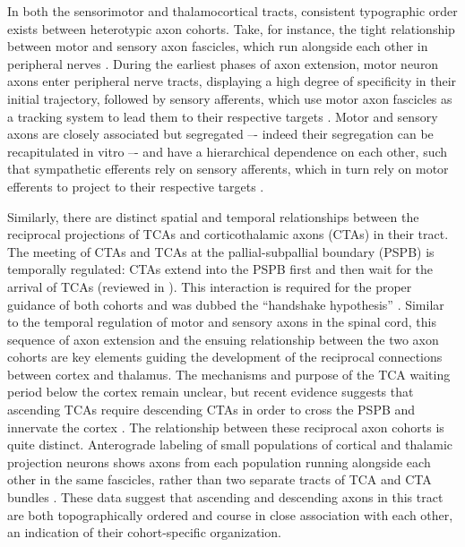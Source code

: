 In both the sensorimotor and thalamocortical tracts, consistent typographic order exists between heterotypic axon cohorts.
Take, for instance, the tight relationship between motor and sensory axon fascicles, which run alongside each other in peripheral nerves \cite{honig1998spatial}. 
During the earliest phases of axon extension, motor neuron axons enter peripheral nerve tracts, displaying a high degree of specificity in their initial trajectory, followed by sensory afferents, which use motor axon fascicles as a tracking system to lead them to their respective targets \cite{landmesser1986altered,huettl2011npn,wang2013axons,wang2014conserved}.
Motor and sensory axons are closely associated but segregated –- indeed their segregation can be recapitulated in vitro \cite{gallarda2008segregation} –- and have a hierarchical dependence on each other, such that sympathetic efferents rely on sensory afferents, which in turn rely on motor efferents to project to their respective targets \cite{wang2014conserved}.

Similarly, there are distinct spatial and temporal relationships between the reciprocal projections of TCAs and corticothalamic axons (CTAs) in their tract.
The meeting of CTAs and TCAs at the pallial-subpallial boundary (PSPB) is temporally regulated: CTAs extend into the PSPB first and then wait for the arrival of TCAs (reviewed in ). 
This interaction is required for the proper guidance of both cohorts and was dubbed the “handshake hypothesis” \cite{molnar1995thalamic}.
Similar to the temporal regulation of motor and sensory axons in the spinal cord, this sequence of axon extension and the ensuing relationship between the two axon cohorts are key elements guiding the development of the reciprocal connections between cortex and thalamus. 
The mechanisms and purpose of the TCA waiting period below the cortex remain unclear, but recent evidence suggests that ascending TCAs require descending CTAs in order to cross the PSPB and innervate the cortex \cite{chen2012evidence}.
The relationship between these reciprocal axon cohorts is quite distinct.
Anterograde labeling of small populations of cortical and thalamic projection neurons shows axons from each population running alongside each other in the same fascicles, rather than two separate tracts of TCA and CTA bundles \cite{molnar1998mechanisms}. 
These data suggest that ascending and descending axons in this tract are both topographically ordered and course in close association with each other, an indication of their cohort-specific organization. 
